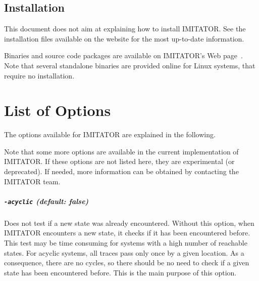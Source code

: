 \documentclass[a4paper,11pt]{report}
\newcommand{\imitator}{\textsf{IMITATOR}}
\newcommand{\styleOption}[1]{\textcolor{optioncolor}{\texttt{#1}}}
\begin{document}
\section{Installation}

This document does not aim at explaining how to install \imitator{}.
See the installation files available on the website for the most up-to-date information.

Binaries and source code packages are available on \imitator{}'s Web page~\cite{imitator}.
Note that several standalone binaries are provided online for Linux systems, that require no installation.



\chapter{List of Options}\label{chapter:options}

The options available for \imitator{} are explained in the following.

Note that some more options are available in the current implementation of \imitator{}.
If these options are not listed here, they are experimental (or deprecated).
If needed, more information can be obtained by contacting the \imitator{} team.


\paragraph{\styleOption{-acyclic} (default: false)}
Does not test if a new state was already encountered.
Without this option, when \imitator{} encounters a new state, it checks if it has been encountered before.
This test may be time consuming for systems with a high number of reachable states.
For acyclic systems, all traces pass only once by a given location.
As a consequence, there are no cycles, so there should be no need to check if a given state has been encountered before.
This is the main purpose of this option.
\end{document}
